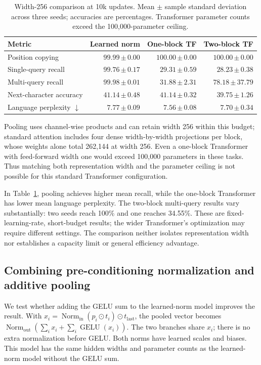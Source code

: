 \documentclass[11pt]{article}
\newcommand{\sd}[2]{#1\,{\scriptstyle\pm\,#2}}
\begin{document}
\begin{table}[htbp]
\centering\small
\caption{Width-256 comparison at 10k updates. Mean \(\pm\) sample standard
deviation across three seeds; accuracies are percentages. Transformer parameter
counts exceed the 100,000-parameter ceiling.}
\label{tab:same-width-comparison}
\begin{tabular}{lrrr}
\toprule
Metric & Learned norm & One-block TF & Two-block TF\\
\midrule
Position copying & \(\sd{99.99}{0.00}\) & \(\sd{100.00}{0.00}\) & \(\sd{100.00}{0.00}\)\\
Single-query recall & \(\sd{99.76}{0.17}\) & \(\sd{29.31}{0.59}\) & \(\sd{28.23}{0.38}\)\\
Multi-query recall & \(\sd{99.98}{0.01}\) & \(\sd{31.88}{2.31}\) & \(\sd{78.18}{37.79}\)\\
Next-character accuracy & \(\sd{41.14}{0.48}\) & \(\sd{41.14}{0.32}\) & \(\sd{39.75}{1.26}\)\\
Language perplexity \(\downarrow\) & \(\sd{7.77}{0.09}\) & \(\sd{7.56}{0.08}\) & \(\sd{7.70}{0.34}\)\\
\bottomrule
\end{tabular}
\end{table}

Pooling uses channel-wise products and can retain width 256 within this budget;
standard attention includes four dense width-by-width projections per block,
whose weights alone total 262,144 at width 256. Even a one-block Transformer
with feed-forward width one would exceed 100,000 parameters in these tasks.
Thus matching both representation width and the parameter ceiling is not
possible for this standard Transformer configuration.

In Table~\ref{tab:same-width-comparison}, pooling achieves higher mean recall,
while the one-block Transformer has lower mean language perplexity. The
two-block multi-query results vary substantially: two seeds reach 100\% and
one reaches 34.55\%. These are fixed-learning-rate, short-budget results;
the wider Transformer's optimization may require different settings. The
comparison neither isolates representation width nor establishes a capacity
limit or general efficiency advantage.

\subsection{Combining pre-conditioning normalization and additive pooling}
We test whether adding the GELU sum to the learned-norm model improves the
result. With \(x_i=\operatorname{Norm}_{\mathrm{in}}(p_i\odot t_i)\odot
t_{\mathrm{last}}\), the pooled vector becomes
\(\operatorname{Norm}_{\mathrm{out}}(\sum_i x_i+\sum_i\operatorname{GELU}(x_i))\).
The two branches share \(x_i\); there is no extra normalization before GELU.
Both norms have learned scales and biases. This model has the same hidden
widths and parameter counts as the learned-norm model without the GELU sum.
\end{document}
